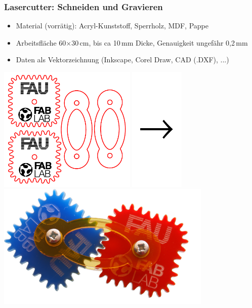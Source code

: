\documentclass[t]{beamer}
\begin{document}
\begin{frame}
	\frametitle{Lasercutter: Schneiden und Gravieren}
	\begin{itemize}
		\item Material (vorrätig): Acryl-Kunststoff, Sperrholz, MDF, Pappe
		\item Arbeitsfläche 60$\times$30\,cm, bis ca 10\,mm Dicke, Genauigkeit ungefähr 0,2\,mm
		\item Daten als Vektorzeichnung (Inkscape, Corel Draw, CAD (.DXF), ...)
	\end{itemize}
	
	\bigskip
	
	\bigskip
	\begin{center}
		\includegraphics[height=6cm]{../img/SquareGears.pdf}
		\includegraphics[height=6cm]{../img/pfeil.pdf}
		\includegraphics[height=6cm]{../img/zahnraeder2b-skaliert.png}
	\end{center}

\end{frame}
\end{document}

